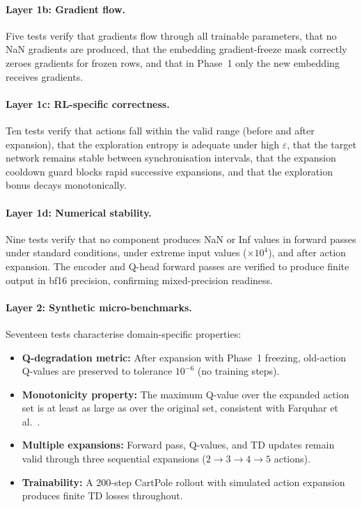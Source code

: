 \documentclass{article}
\begin{document}
\paragraph{Layer 1b: Gradient flow.}
Five tests verify that gradients flow through all trainable parameters, that no
NaN gradients are produced, that the embedding gradient-freeze mask correctly
zeroes gradients for frozen rows, and that in Phase~1 only the new embedding
receives gradients.

\paragraph{Layer 1c: RL-specific correctness.}
Ten tests verify that actions fall within the valid range (before and after
expansion), that the exploration entropy is adequate under high $\varepsilon$,
that the target network remains stable between synchronisation intervals, that
the expansion cooldown guard blocks rapid successive expansions, and that the
exploration bonus decays monotonically.

\paragraph{Layer 1d: Numerical stability.}
Nine tests verify that no component produces NaN or Inf values in forward
passes under standard conditions, under extreme input values ($\times 10^4$),
and after action expansion. The encoder and Q-head forward passes are verified
to produce finite output in bf16 precision, confirming mixed-precision
readiness.

\paragraph{Layer 2: Synthetic micro-benchmarks.}
Seventeen tests characterise domain-specific properties:
\begin{itemize}[nosep]
  \item \textbf{Q-degradation metric:} After expansion with Phase~1 freezing,
  old-action Q-values are preserved to tolerance $10^{-6}$ (no training steps).
  \item \textbf{Monotonicity property:} The maximum Q-value over the expanded
  action set is at least as large as over the original set, consistent with
  Farquhar et al.~\cite{farquhar2020growing}.
  \item \textbf{Multiple expansions:} Forward pass, Q-values, and TD updates
  remain valid through three sequential expansions ($2\to3\to4\to5$ actions).
  \item \textbf{Trainability:} A 200-step CartPole rollout with simulated
  action expansion produces finite TD losses throughout.
\end{itemize}
\end{document}
